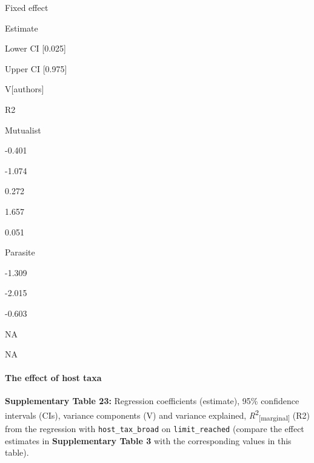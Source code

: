 \documentclass[
]{article}
\begin{document}
Fixed effect

Estimate

Lower CI {[}0.025{]}

Upper CI {[}0.975{]}

V{[}authors{]}

R2

Mutualist

-0.401

-1.074

0.272

1.657

0.051

Parasite

-1.309

-2.015

-0.603

NA

NA

\hypertarget{the-effect-of-host-taxa-2}{%
\paragraph{The effect of host taxa}\label{the-effect-of-host-taxa-2}}

\textbf{Supplementary Table 23:} Regression coefficients (estimate),
95\% confidence intervals (CIs), variance components (V) and variance
explained, \emph{R}\textsuperscript{2}\textsubscript{{[}marginal{]}}
(R2) from the regression with \texttt{host\_tax\_broad} on
\texttt{limit\_reached} (compare the effect estimates in
\textbf{Supplementary Table 3} with the corresponding values in this
table).
\end{document}
